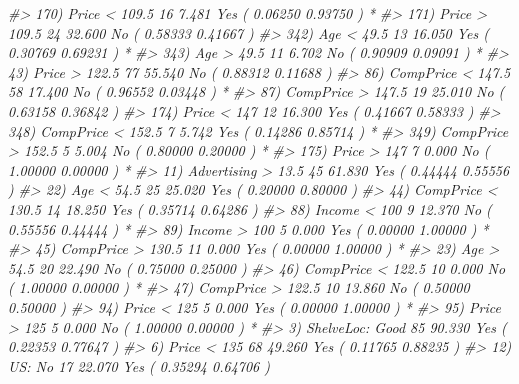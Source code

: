 \documentclass[
]{book}
\newenvironment{Shaded}{\begin{snugshade}}{\end{snugshade}}
\newcommand{\CommentTok}[1]{\textcolor[rgb]{0.56,0.35,0.01}{\textit{#1}}}
\begin{document}
\begin{Shaded}
\begin{Highlighting}[]
\CommentTok{\#\textgreater{}               170) Price \textless{} 109.5 16   7.481 Yes ( 0.06250 0.93750 ) *}
\CommentTok{\#\textgreater{}               171) Price \textgreater{} 109.5 24  32.600 No ( 0.58333 0.41667 )  }
\CommentTok{\#\textgreater{}                 342) Age \textless{} 49.5 13  16.050 Yes ( 0.30769 0.69231 ) *}
\CommentTok{\#\textgreater{}                 343) Age \textgreater{} 49.5 11   6.702 No ( 0.90909 0.09091 ) *}
\CommentTok{\#\textgreater{}            43) Price \textgreater{} 122.5 77  55.540 No ( 0.88312 0.11688 )  }
\CommentTok{\#\textgreater{}              86) CompPrice \textless{} 147.5 58  17.400 No ( 0.96552 0.03448 ) *}
\CommentTok{\#\textgreater{}              87) CompPrice \textgreater{} 147.5 19  25.010 No ( 0.63158 0.36842 )  }
\CommentTok{\#\textgreater{}               174) Price \textless{} 147 12  16.300 Yes ( 0.41667 0.58333 )  }
\CommentTok{\#\textgreater{}                 348) CompPrice \textless{} 152.5 7   5.742 Yes ( 0.14286 0.85714 ) *}
\CommentTok{\#\textgreater{}                 349) CompPrice \textgreater{} 152.5 5   5.004 No ( 0.80000 0.20000 ) *}
\CommentTok{\#\textgreater{}               175) Price \textgreater{} 147 7   0.000 No ( 1.00000 0.00000 ) *}
\CommentTok{\#\textgreater{}        11) Advertising \textgreater{} 13.5 45  61.830 Yes ( 0.44444 0.55556 )  }
\CommentTok{\#\textgreater{}          22) Age \textless{} 54.5 25  25.020 Yes ( 0.20000 0.80000 )  }
\CommentTok{\#\textgreater{}            44) CompPrice \textless{} 130.5 14  18.250 Yes ( 0.35714 0.64286 )  }
\CommentTok{\#\textgreater{}              88) Income \textless{} 100 9  12.370 No ( 0.55556 0.44444 ) *}
\CommentTok{\#\textgreater{}              89) Income \textgreater{} 100 5   0.000 Yes ( 0.00000 1.00000 ) *}
\CommentTok{\#\textgreater{}            45) CompPrice \textgreater{} 130.5 11   0.000 Yes ( 0.00000 1.00000 ) *}
\CommentTok{\#\textgreater{}          23) Age \textgreater{} 54.5 20  22.490 No ( 0.75000 0.25000 )  }
\CommentTok{\#\textgreater{}            46) CompPrice \textless{} 122.5 10   0.000 No ( 1.00000 0.00000 ) *}
\CommentTok{\#\textgreater{}            47) CompPrice \textgreater{} 122.5 10  13.860 No ( 0.50000 0.50000 )  }
\CommentTok{\#\textgreater{}              94) Price \textless{} 125 5   0.000 Yes ( 0.00000 1.00000 ) *}
\CommentTok{\#\textgreater{}              95) Price \textgreater{} 125 5   0.000 No ( 1.00000 0.00000 ) *}
\CommentTok{\#\textgreater{}     3) ShelveLoc: Good 85  90.330 Yes ( 0.22353 0.77647 )  }
\CommentTok{\#\textgreater{}       6) Price \textless{} 135 68  49.260 Yes ( 0.11765 0.88235 )  }
\CommentTok{\#\textgreater{}        12) US: No 17  22.070 Yes ( 0.35294 0.64706 )  }

\end{Highlighting}
\end{Shaded}
\end{document}
